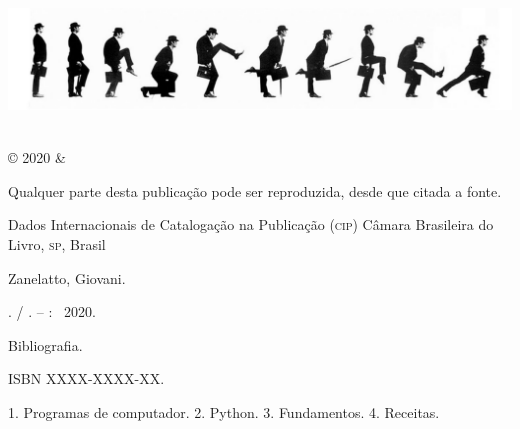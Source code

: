 \documentclass[
	12pt,				%
	openright,			%
	twoside,			%
	a4paper,			%
	english,			%
	french,				%
	brazil,				%
	sumario=tradicional
]{abntex2}
\begin{document}
\begin{titlingpage}

\phantom{xxx}
\vspace{0.5cm}
\huge
\raggedright
\imprimirautor\\
\vspace{2.5cm}
\huge 
{\raggedleft
\includegraphics[scale=0.3]{MontyPythonSillyWalkDiagram.pdf}\\[1cm]
\textit{\textcolor{blue}{\imprimirtitulo}}\\[1cm]
}
\centering 
\vfill
\Large
\imprimirinstituicao

\clearpage
\ABNTEXfontereduzida
© 2020 \imprimirautor \space \& \imprimirinstituicao

Qualquer parte desta publicação pode ser reproduzida, desde que citada a fonte.

\vspace*{\fill}

\begin{center}
Dados Internacionais de Catalogação na Publicação (\textsc{cip})
Câmara Brasileira do Livro, \textsc{sp}, Brasil
\end{center}

\begin{mdframed}
\noindent Zanelatto, Giovani. %

\imprimirtitulo. / \imprimirautor. -- \imprimirlocal: \imprimirinstituicao\ 
 2020.

\medskip

Bibliografia.

ISBN XXXX-XXXX-XX.

\medskip

1. Programas de computador. 2. Python. 3. Fundamentos. 4. Receitas.

\end{mdframed}

\end{titlingpage}
\end{document}
